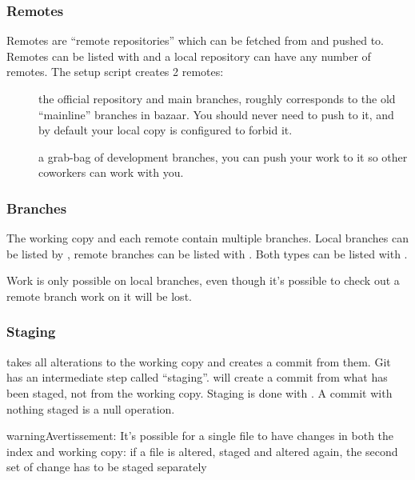 \documentclass[a4paper,10pt,french]{sphinxmanual}
\begin{document}
\subsubsection{Remotes}
\label{\detokenize{docs/tuts/autocad-tut01:remotes}}
Remotes are ``remote repositories'' which can be fetched from and pushed
to. Remotes can be listed with  and a local
repository can have any number of remotes. The setup script creates 2 remotes:
\begin{description}
\item[{}] \leavevmode
the official repository and main branches, roughly corresponds to the old
``mainline'' branches in bazaar. You should never need to push to it, and by
default your local copy is configured to forbid it.

\item[{}] \leavevmode
a grab-bag of development branches, you can push your work to it so other
coworkers can work with you.

\end{description}


\subsubsection{Branches}
\label{\detokenize{docs/tuts/autocad-tut01:branches}}
The working copy and each remote contain multiple branches. Local branches can
be listed by , remote branches can be listed with . Both types can be listed with .

Work is only possible on local branches, even though it's possible to check
out a remote branch work on it will be lost.


\subsubsection{Staging}
\label{\detokenize{docs/tuts/autocad-tut01:staging}}
 takes all alterations to the working copy and creates a commit
from them. Git has an intermediate step called ``staging''.  will
create a commit from what has been staged, not from the working copy. Staging is done with . A commit with nothing
staged is a null operation.

\begin{sphinxadmonition}{warning}{Avertissement:}
It's possible for a single file to have changes in both the index and
working copy: if a file is altered, staged and altered again, the second
set of change has to be staged separately
\end{sphinxadmonition}
\end{document}
